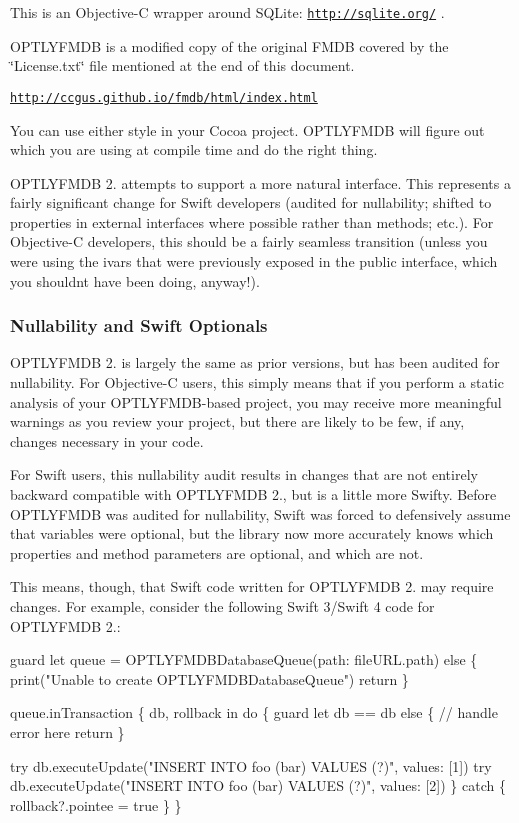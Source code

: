 This is an Objective-\/C wrapper around S\+Q\+Lite\+: \href{http://sqlite.org/}{\tt http\+://sqlite.\+org/} .

O\+P\+T\+L\+Y\+F\+M\+DB is a modified copy of the original F\+M\+DB covered by the \char`\"{}\+License.\+txt\char`\"{} file mentioned at the end of this document.

\href{http://ccgus.github.io/fmdb/html/index.html}{\tt http\+://ccgus.\+github.\+io/fmdb/html/index.\+html}

You can use either style in your Cocoa project. O\+P\+T\+L\+Y\+F\+M\+DB will figure out which you are using at compile time and do the right thing.

O\+P\+T\+L\+Y\+F\+M\+DB 2. attempts to support a more natural interface. This represents a fairly significant change for Swift developers (audited for nullability; shifted to properties in external interfaces where possible rather than methods; etc.). For Objective-\/C developers, this should be a fairly seamless transition (unless you were using the ivars that were previously exposed in the public interface, which you shouldn\textquotesingle{}t have been doing, anyway!).

\subsubsection*{Nullability and Swift Optionals}

O\+P\+T\+L\+Y\+F\+M\+DB 2. is largely the same as prior versions, but has been audited for nullability. For Objective-\/C users, this simply means that if you perform a static analysis of your O\+P\+T\+L\+Y\+F\+M\+D\+B-\/based project, you may receive more meaningful warnings as you review your project, but there are likely to be few, if any, changes necessary in your code.

For Swift users, this nullability audit results in changes that are not entirely backward compatible with O\+P\+T\+L\+Y\+F\+M\+DB 2., but is a little more Swifty. Before O\+P\+T\+L\+Y\+F\+M\+DB was audited for nullability, Swift was forced to defensively assume that variables were optional, but the library now more accurately knows which properties and method parameters are optional, and which are not.

This means, though, that Swift code written for O\+P\+T\+L\+Y\+F\+M\+DB 2. may require changes. For example, consider the following Swift 3/\+Swift 4 code for O\+P\+T\+L\+Y\+F\+M\+DB 2.\+: 
\begin{DoxyCode}
guard let queue = OPTLYFMDBDatabaseQueue(path: fileURL.path) else \{
    print("Unable to create OPTLYFMDBDatabaseQueue")
    return
\}

queue.inTransaction \{ db, rollback in
    do \{
        guard let db == db else \{
            // handle error here
            return
        \}

        try db.executeUpdate("INSERT INTO foo (bar) VALUES (?)", values: [1])
        try db.executeUpdate("INSERT INTO foo (bar) VALUES (?)", values: [2])
    \} catch \{
        rollback?.pointee = true
    \}
\}
\end{DoxyCode}


